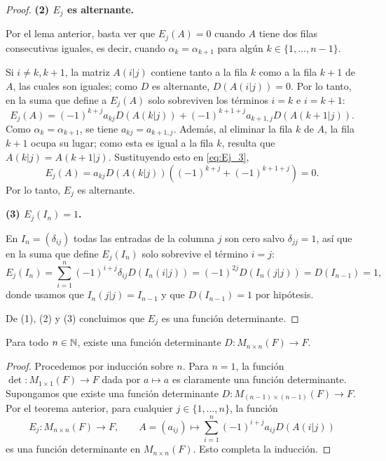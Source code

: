 \documentclass[12pt,a4paper]{book}
\newcommand{\llaves}[1]{\{#1\}}
\newcommand{\parentesis}[1]{\left(#1\right)}
\begin{document}
\begin{proof}
        \textbf{(2) $E_j$ es alternante.}

        Por el lema anterior, basta ver que $E_j(A) = 0$ cuando $A$ tiene dos filas consecutivas iguales, es decir, cuando $\alpha_k = \alpha_{k+1}$ para algún $k \in \llaves{1, \dots, n-1}$.

        Si $i \neq k, k+1$, la matriz $A(i|j)$ contiene tanto a la fila $k$ como a la fila $k+1$ de $A$, las cuales son iguales; como $D$ es alternante, $D(A(i|j)) = 0$. Por lo tanto, en la suma que define a $E_j(A)$ solo sobreviven los términos $i = k$ e $i = k+1$:
        \begin{equation}
            E_j(A) = (-1)^{k+j} a_{kj} D(A(k|j)) + (-1)^{k+1+j} a_{k+1,j} D(A(k+1|j)).
            \label{eq:Ej_3}
        \end{equation}
        Como $\alpha_k = \alpha_{k+1}$, se tiene $a_{kj} = a_{k+1,j}$. Además, al eliminar la fila $k$ de $A$, la fila $k+1$ ocupa su lugar; como esta es igual a la fila $k$, resulta que $A(k|j) = A(k+1|j)$. Sustituyendo esto en \eqref{eq:Ej_3},
        \begin{equation*}
            E_j(A) = a_{kj} D(A(k|j)) \parentesis{(-1)^{k+j} + (-1)^{k+1+j}} = 0.
        \end{equation*}
        Por lo tanto, $E_j$ es alternante.

        \textbf{(3) $E_j(I_n) = 1$.}

        En $I_n = (\delta_{ij})$ todas las entradas de la columna $j$ son cero salvo $\delta_{jj} = 1$, así que en la suma que define $E_j(I_n)$ solo sobrevive el término $i = j$:
        \begin{equation*}
            E_j(I_n) = \sum_{i=1}^n (-1)^{i+j} \delta_{ij} D(I_n(i|j)) = (-1)^{2j} D(I_n(j|j)) = D(I_{n-1}) = 1,
        \end{equation*}
        donde usamos que $I_n(j|j) = I_{n-1}$ y que $D(I_{n-1}) = 1$ por hipótesis.

        De (1), (2) y (3) concluimos que $E_j$ es una función determinante.
    \end{proof}

    \begin{corolario}
        Para todo $n \in \mathbb{N}$, existe una función determinante $D: M_{n \times n}(F) \to F$.
    \end{corolario}

    \begin{proof}
        Procedemos por inducción sobre $n$. Para $n = 1$, la función $\det: M_{1 \times 1}(F) \to F$ dada por $a \mapsto a$ es claramente una función determinante. Supongamos que existe una función determinante $D: M_{(n-1) \times (n-1)}(F) \to F$. Por el teorema anterior, para cualquier $j \in \llaves{1, \dots, n}$, la función
        \begin{equation*}
            E_j : M_{n \times n}(F) \to F, \qquad A = (a_{ij}) \mapsto \sum_{i=1}^n (-1)^{i+j} a_{ij} D(A(i|j))
        \end{equation*}
        es una función determinante en $M_{n \times n}(F)$. Esto completa la inducción.
    \end{proof}
\end{document}
